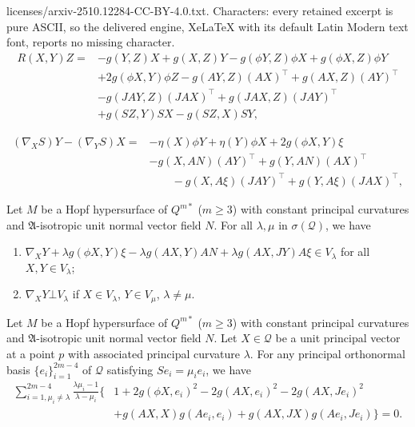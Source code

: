 \documentclass[10pt,a4paper]{amsart}
\begin{document}
licenses/arxiv-2510.12284-CC-BY-4.0.txt. Characters: every retained excerpt is pure ASCII, so the delivered engine, XeLaTeX with its default Latin Modern text font, reports no missing character.
\begin{equation}\label{eqn:2.8}
\begin{split}
R(X,Y)Z=&-g(Y,Z)X+g(X,Z)Y-g(\phi Y,Z)\phi X+g(\phi X,Z)\phi Y\\
 &+2g(\phi X,Y)\phi Z-g(AY,Z)(AX)^\top+g(AX,Z)(AY)^\top\\
 &-g(JAY,Z)(JAX)^\top+g(JAX,Z)(JAY)^\top\\
 &+g(SZ,Y)SX-g(SZ,X)SY,
 \end{split}
\end{equation}

\begin{equation}\label{eqn:2.9}
\begin{split}
(\nabla_X S)Y-(\nabla_Y S)X=&-\eta(X)\phi Y+\eta(Y)\phi X+2g(\phi X,Y)\xi\\
&-g(X,AN)(AY)^\top+g(Y,AN)(AX)^\top\\
 &\qquad -g(X,A\xi)(JAY)^\top +g(Y,A\xi)(JAX)^\top,
\end{split}
\end{equation}

\begin{lemma}\label{lemma:5.2}
Let $M$ be a Hopf hypersurface of $Q^{m*}$ ($m\geq3$) with constant principal curvatures and $\mathfrak{A}$-isotropic unit normal vector field $N$. For all $\lambda,\mu$ in $\sigma(\mathcal{Q})$, we have
%
\begin{enumerate}
\item[(1)]
$\nabla_X Y+\lambda g(\phi X,Y)\xi-\lambda g(AX,Y)AN+\lambda g(AX,JY)A\xi\in V_\lambda$ for all $X,Y\in V_\lambda$;

\item[(2)]
$\nabla_X Y\bot V_\lambda$ if $X\in V_\lambda$, $Y\in V_\mu$, $\lambda\neq\mu$.
\end{enumerate}
\end{lemma}

\begin{lemma}\label{lemma:5.3}
Let $M$ be a Hopf hypersurface of $Q^{m*}$ ($m\geq3$) with constant principal curvatures and $\mathfrak{A}$-isotropic unit normal vector field $N$. Let $X\in \mathcal{Q}$ be a unit principal vector at a point $p$ with
associated principal curvature $\lambda$. For any principal orthonormal basis $\{e_i\}_{i=1}^{2m-4}$ of
$\mathcal{Q}$ satisfying $Se_i=\mu_ie_i$, we have
%
\begin{equation}\label{eqn:ca2}
\begin{aligned}
\sum_{i=1, \mu_i\neq\lambda}^{2m-4}\frac{\lambda\mu_i-1}{\lambda-\mu_i}\Big\{&1+2g(\phi X,e_i)^2-2g(AX,e_i)^2-2g(AX,Je_i)^2\\
&+g(AX,X)g(Ae_i,e_i)+g(AX,JX)g(Ae_i,Je_i)\Big\}=0.
\end{aligned}
\end{equation}
\end{lemma}
\end{document}
